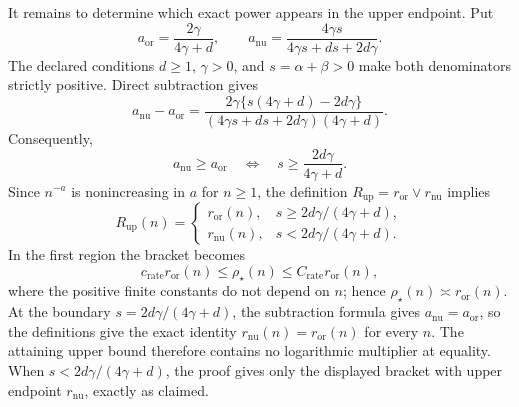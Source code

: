 It remains to determine which exact power appears in the upper endpoint.  Put
\[
 a_{\mathrm{or}}=\frac{2\gamma}{4\gamma+d},
 \qquad
 a_{\mathrm{nu}}=\frac{4\gamma s}{4\gamma s+ds+2d\gamma}.
\]
The declared conditions \(d\ge1\), \(\gamma>0\), and \(s=\alpha+\beta>0\) make both denominators strictly positive.  Direct subtraction gives
\[
 a_{\mathrm{nu}}-a_{\mathrm{or}}
 =\frac{2\gamma\{s(4\gamma+d)-2d\gamma\}}
 {(4\gamma s+ds+2d\gamma)(4\gamma+d)}.
\]
Consequently,
\[
 a_{\mathrm{nu}}\ge a_{\mathrm{or}}
 \quad\Longleftrightarrow\quad
 s\ge\frac{2d\gamma}{4\gamma+d}.
\]
Since \(n^{-a}\) is nonincreasing in \(a\) for \(n\ge1\), the definition
\(R_{\mathrm{up}}=r_{\mathrm{or}}\vee r_{\mathrm{nu}}\) implies
\[
 R_{\mathrm{up}}(n)=
 \begin{cases}
 r_{\mathrm{or}}(n),&s\ge 2d\gamma/(4\gamma+d),\\
 r_{\mathrm{nu}}(n),&s<2d\gamma/(4\gamma+d).
 \end{cases}
\]
In the first region the bracket becomes
\[
 c_{\mathrm{rate}}r_{\mathrm{or}}(n)
 \le \rho_\star(n)
 \le C_{\mathrm{rate}}r_{\mathrm{or}}(n),
\]
where the positive finite constants do not depend on \(n\); hence \(\rho_\star(n)\asymp r_{\mathrm{or}}(n)\).  At the boundary \(s=2d\gamma/(4\gamma+d)\), the subtraction formula gives \(a_{\mathrm{nu}}=a_{\mathrm{or}}\), so the definitions give the exact identity \(r_{\mathrm{nu}}(n)=r_{\mathrm{or}}(n)\) for every \(n\).  The attaining upper bound therefore contains no logarithmic multiplier at equality.  When \(s<2d\gamma/(4\gamma+d)\), the proof gives only the displayed bracket with upper endpoint \(r_{\mathrm{nu}}\), exactly as claimed.
